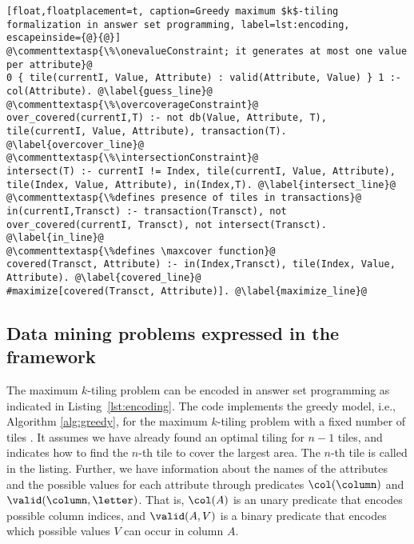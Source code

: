 \begin{lstlisting}[float,floatplacement=t, caption=Greedy maximum $k$-tiling formalization in answer set programming, label=lst:encoding, escapeinside={@}{@}] 
@\commenttextasp{\%\onevalueConstraint; it generates at most one value per attribute}@
0 { tile(currentI, Value, Attribute) : valid(Attribute, Value) } 1 :- col(Attribute). @\label{guess_line}@
@\commenttextasp{\%\overcoverageConstraint}@
over_covered(currentI,T) :- not db(Value, Attribute, T), tile(currentI, Value, Attribute), transaction(T). @\label{overcover_line}@
@\commenttextasp{\%\intersectionConstraint}@
intersect(T) :- currentI != Index, tile(currentI, Value, Attribute), tile(Index, Value, Attribute), in(Index,T). @\label{intersect_line}@
@\commenttextasp{\%defines presence of tiles in transactions}@
in(currentI,Transct) :- transaction(Transct), not over_covered(currentI, Transct), not intersect(Transct). @\label{in_line}@
@\commenttextasp{\%defines \maxcover function}@
covered(Transct, Attribute) :- in(Index,Transct), tile(Index, Value, Attribute). @\label{covered_line}@
#maximize[covered(Transct, Attribute)]. @\label{maximize_line}@
\end{lstlisting}

\subsection{Data mining problems expressed in the framework} 

The maximum $k$-tiling problem can be encoded in answer set programming as indicated in Listing~\ref{lst:encoding}. The code implements the greedy model, i.e., Algorithm \ref{alg:greedy}, for the maximum $k$-tiling problem with a fixed number of tiles \citep{tiling}. It assumes we have already found an optimal tiling for $n-1$ tiles, and indicates how to find the $n$-th tile to cover the largest area. The $n$-th tile is called \guess in the listing. \changesb Further, we have information about the names of the attributes and the possible values for each attribute through predicates $\col(\column)$ and $\valid(\column, \letter)$. That is, $\col(A)$ is an unary predicate that encodes possible column indices, and $\valid(A,V)$ is a binary predicate that encodes which possible values $V$ can occur in column $A$. \changese

